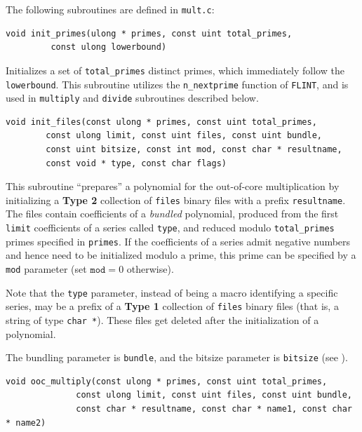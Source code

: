 \documentclass[a4paper,10pt]{article}
\newcommand{\code}{\lstinline}
\begin{document}
The following subroutines are defined in \code{mult.c}:

\begin{lstlisting}
void init_primes(ulong * primes, const uint total_primes,
		 const ulong lowerbound)
\end{lstlisting}

Initializes a set of \code{total_primes} distinct primes, which immediately follow the \code{lowerbound}. This subroutine utilizes the \code{n_nextprime} function of \code{FLINT}, and is used in \code{multiply} and \code{divide} subroutines described below.

\begin{lstlisting}
void init_files(const ulong * primes, const uint total_primes,
		const ulong limit, const uint files, const uint bundle,
		const uint bitsize, const int mod, const char * resultname,
		const void * type, const char flags)
\end{lstlisting}

This subroutine ``prepares'' a polynomial for the out-of-core multiplication by initializing a \textbf{Type 2} collection of \code{files} binary files with a prefix \code{resultname}. The files contain coefficients of a \emph{bundled} polynomial, produced from the first \code{limit} coefficients of a series called \code{type}, and reduced modulo \code{total_primes} primes specified in \code{primes}. If the coefficients of a series admit negative numbers and hence need to be initialized modulo a prime, this prime can be specified by a \code{mod} parameter (set $\texttt{mod} = 0$ otherwise).

Note that the \code{type} parameter, instead of being a macro identifying a specific series, may be a prefix of a \textbf{Type 1} collection of \code{files} binary files (that is, a string of type \code{char *}). These files get deleted after the initialization of a polynomial. %

The bundling parameter is \code{bundle}, and the bitsize parameter is \code{bitsize} (see \cite[Section 4.1]{mosunov}).

\begin{lstlisting}
void ooc_multiply(const ulong * primes, const uint total_primes,
	          const ulong limit, const uint files, const uint bundle,
	          const char * resultname, const char * name1, const char * name2)
\end{lstlisting}
\end{document}
